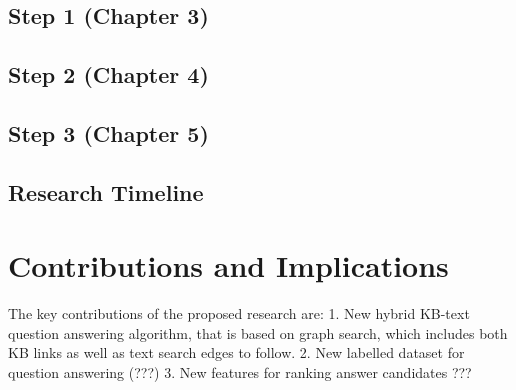 \subsection{Step 1 (Chapter 3)}
\label{sec:plan1}

\subsection{Step 2 (Chapter 4)}
\label{sec:plan2}

\subsection{Step 3 (Chapter 5)}
\label{sec:plan3}

\subsection{Research Timeline}




\section{Contributions and Implications}

The key contributions of the proposed research are:
1. New hybrid KB-text question answering algorithm, that is based on graph search, which includes both KB links as well as text search edges to follow.
2. New labelled dataset for question answering (???)
3. New features for ranking answer candidates ???
